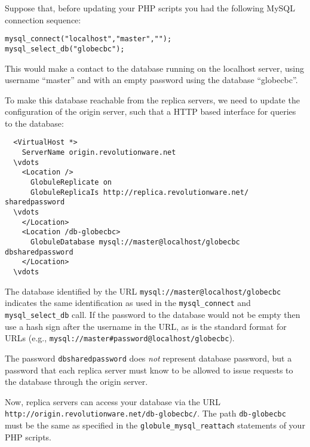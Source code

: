 \documentclass[10pt,a4paper]{article}
\makeatletter
\newenvironment{p}{\@open{P}{}}{\@close{P}}
\newenvironment{p}{}{\par}
\makeatother
\begin{document}
\begin{p}
Suppose that, before updating your PHP scripts you had the following
MySQL connection sequence:
\end{p}

\begin{Verbatim}
mysql_connect("localhost","master","");
mysql_select_db("globecbc");
\end{Verbatim}

\begin{p}
This would make a contact to the database running on the localhost server,
using username ``master'' and with an empty password using the database
``globecbc''.
\end{p}

\begin{p}
To make this database reachable from the replica servers, we need to update
the configuration of the origin server, such that a HTTP based interface for
queries to the database:
\end{p}

\begin{Verbatim}
  <VirtualHost *>
    ServerName origin.revolutionware.net
  \vdots
    <Location />
      GlobuleReplicate on
      GlobuleReplicaIs http://replica.revolutionware.net/  sharedpassword
  \vdots
    </Location>
    <Location /db-globecbc>
      GlobuleDatabase mysql://master@localhost/globecbc dbsharedpassword
    </Location>
  \vdots
\end{Verbatim}

\begin{p}
The database identified by the URL \verb!mysql://master@localhost/globecbc!
indicates the same identification as used in the \texttt{mysql\_connect} and
\texttt{mysql\_select\_db} call.  If the password to the database would not be
empty then use a hash sign after the username in the URL, as is the standard
format for URLs (e.g., \verb!mysql://master#password@localhost/globecbc!).
\end{p}

\begin{p}
The password \texttt{dbsharedpassword} does \emph{not} represent database
password, but a password that each replica server must know to be allowed to
issue requests to the database through the origin server.
\end{p}

\begin{p}
Now, replica servers can access your database via the URL
\verb!http://origin.revolutionware.net/db-globecbc/!. The path
\texttt{db-globecbc} must be the same as specified in the
\texttt{globule\_mysql\_reattach} statements of your PHP scripts.
\end{p}
\end{document}
